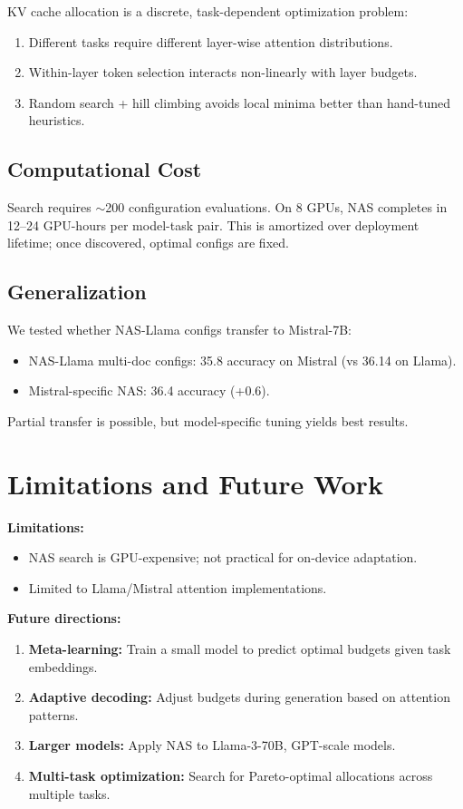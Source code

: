 \documentclass[11pt,a4paper]{article}
\begin{document}
KV cache allocation is a discrete, task-dependent optimization problem:
\begin{enumerate}
    \item Different tasks require different layer-wise attention distributions.
    \item Within-layer token selection interacts non-linearly with layer budgets.
    \item Random search + hill climbing avoids local minima better than hand-tuned heuristics.
\end{enumerate}

\subsection{Computational Cost}

Search requires $\sim$200 configuration evaluations. On 8 GPUs, NAS completes in 12–24 GPU-hours per model-task pair. This is amortized over deployment lifetime; once discovered, optimal configs are fixed.

\subsection{Generalization}

We tested whether NAS-Llama configs transfer to Mistral-7B:
\begin{itemize}
    \item NAS-Llama multi-doc configs: 35.8 accuracy on Mistral (vs 36.14 on Llama).
    \item Mistral-specific NAS: 36.4 accuracy (+0.6).
\end{itemize}

Partial transfer is possible, but model-specific tuning yields best results.

\section{Limitations and Future Work}

\textbf{Limitations:}
\begin{itemize}
    \item NAS search is GPU-expensive; not practical for on-device adaptation.
    \item Limited to Llama/Mistral attention implementations.
\end{itemize}

\textbf{Future directions:}
\begin{enumerate}
    \item \textbf{Meta-learning:} Train a small model to predict optimal budgets given task embeddings.
    \item \textbf{Adaptive decoding:} Adjust budgets during generation based on attention patterns.
    \item \textbf{Larger models:} Apply NAS to Llama-3-70B, GPT-scale models.
    \item \textbf{Multi-task optimization:} Search for Pareto-optimal allocations across multiple tasks.
\end{enumerate}
\end{document}
